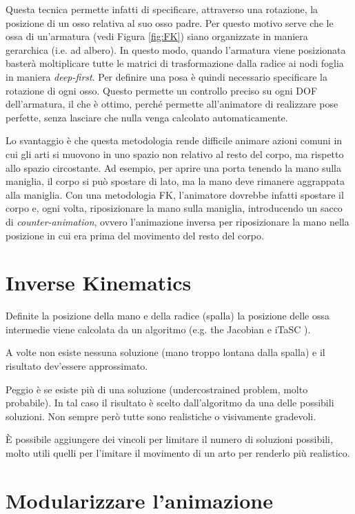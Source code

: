Questa tecnica permette infatti di specificare, attraverso una rotazione, la posizione di un osso relativa al suo osso padre. Per questo motivo serve che le ossa di un'armatura (vedi Figura \ref{fig:FK}) siano organizzate in maniera gerarchica (i.e. ad albero). In questo modo, quando l'armatura viene posizionata basterà moltiplicare tutte le matrici di trasformazione dalla radice ai nodi foglia in maniera \emph{deep-first}. 
Per definire una posa è quindi necessario specificare la rotazione di ogni osso. Questo permette un controllo preciso su ogni DOF dell'armatura, il che è ottimo, perché permette all'animatore di realizzare pose perfette, senza lasciare che nulla venga calcolato automaticamente. 

Lo svantaggio è che questa metodologia rende difficile animare azioni comuni in cui gli arti si muovono in uno spazio non relativo al resto del corpo, ma rispetto allo spazio circostante. Ad esempio, per aprire una porta tenendo la mano sulla maniglia, il corpo si può spostare di lato, ma la mano deve rimanere aggrappata alla maniglia. Con una metodologia FK, l'animatore dovrebbe infatti spostare il corpo e, ogni volta, riposizionare la mano sulla maniglia, introducendo un sacco di \emph{counter-animation}, ovvero l'animazione inversa per riposizionare la mano nella posizione in cui era prima del movimento del resto del corpo.

\section{Inverse Kinematics} \label{sectionIK}
Definite la posizione della mano e della radice (spalla) la posizione delle ossa intermedie viene calcolata da un algoritmo (e.g. the Jacobian \cite{Parent:2012:CAA:2385444} e iTaSC \cite{blendWiki}).

A volte non esiste nessuna soluzione (mano troppo lontana dalla spalla) e il risultato dev'essere approssimato.

Peggio è se esiste più di una soluzione (undercostrained problem, molto probabile). In tal caso il risultato è scelto dall'algoritmo da una delle possibili soluzioni. Non sempre però tutte sono realistiche o visivamente gradevoli.

È possibile aggiungere dei vincoli per limitare il numero di soluzioni possibili, molto utili quelli per l'imitare il movimento di un arto per renderlo più realistico.
\section{Modularizzare l'animazione}

